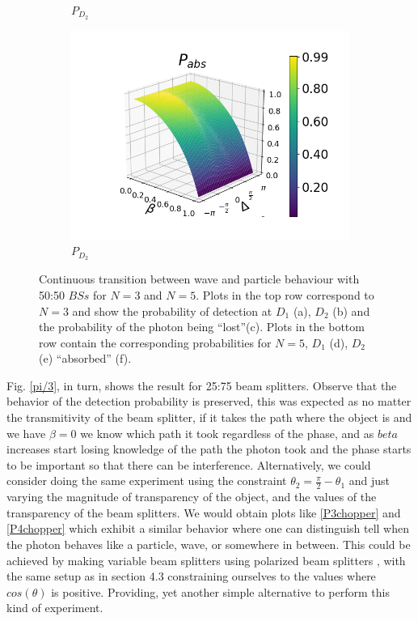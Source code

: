 \documentclass[12pt]{book}
\begin{document}
\begin{figure}[t!]
\begin{subfigure}[b]{0.3\linewidth}
\caption{$P_{D_{2}}$ }
\label{fig:BS1}
\end{subfigure}
\begin{subfigure}[b]{0.3\linewidth}
\includegraphics[width=\linewidth]{images/pabs_5_pi4.png}
\caption{$P_{D_{2}}$ }
\label{fig:BS1}
\end{subfigure}
\caption{Continuous transition between wave and particle behaviour with 50:50 $BSs$ for $N=3$ and $N=5$. Plots in the top row correspond to $N=3$ and show the probability of detection at $D_{1}$ (a), $D_{2}$ (b) and the probability of the photon being ``lost''(c). Plots in the bottom row contain the corresponding probabilities for $N=5$,  $D_{1}$ (d),  $D_{2}$ (e)  ``absorbed'' (f).}
\label{varias}
\end{figure}

Fig. \ref{pi/3}, in turn, shows the result for 25:75 beam splitters. Observe that the behavior of the detection probability is preserved, this was expected as no matter the transmitivity of the beam splitter, if it takes the path where the object is and we have $\beta=0$ we know which path it took regardless of the phase, and as $beta$ increases start losing knowledge of the path the photon took and the phase starts to be important so that there can be interference. Alternatively, we could consider doing the same experiment using the constraint $\theta_{2}=\frac{\pi}{2}-\theta_{1}$ and just varying the magnitude of transparency of the object, and the values of the transparency of the beam splitters. We would obtain plots like \ref{P3chopper} and \ref{P4chopper} which exhibit a similar behavior where one can distinguish tell when the photon behaves like a particle, wave, or somewhere in between. This could be achieved by making variable beam splitters using polarized beam splitters \cite{variable}, with the same setup as in section 4.3 constraining ourselves to the values where $cos(\theta)$ is positive. Providing, yet another simple alternative to perform this kind of experiment.
\end{document}
